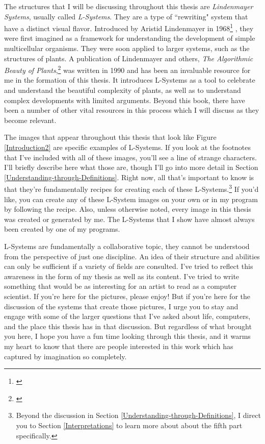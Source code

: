 \documentclass[12pt,twoside]{reedthesis}
\begin{document}
The structures that I will be discussing throughout this thesis are \textit{Lindenmayer Systems}, usually called \textit{L-Systems}. They are a type of ``rewriting" system that have a distinct visual flavor. Introduced by Aristid Lindenmayer in 1968\footnote{\cite{OG1967}} , they were first imagined as a framework for understanding the development of simple multicellular organisms. They were soon applied to larger systems, such as the structures of plants. A publication of Lindenmayer and others, \textit{The Algorithmic Beauty of Plants},\footnote{\cite{ABOP1990}} was written in 1990 and has been an invaluable resource for me in the formation of this thesis. It introduces L-Systems as a tool to celebrate and understand the beautiful complexity of plants, as well as to understand complex developments with limited arguments. Beyond this book, there have been a number of other vital resources in this process which I will discuss as they become relevant.

The images that appear throughout this thesis that look like Figure \ref{Introduction2} are specific examples of L-Systems. If you look at the footnotes that I've included with all of these images, you'll see a line of strange characters. I'll briefly describe here what those are, though I'll go into more detail in Section \ref{Understanding-through-Definitions}. Right now, all that's important to know is that they're fundamentally recipes for creating each of these L-Systems.\footnote{Beyond the discussion in Section \ref{Understanding-through-Definitions}, I direct you to Section \ref{Interpretations} to learn more about about the fifth part specifically.} If you'd like, you can create any of these L-System images on your own or in my program by following the recipe.  Also, unless otherwise noted, every image in this thesis was created or generated by me. The L-Systems that I show have almost always been created by one of my programs. 

L-Systems are fundamentally a collaborative topic, they cannot be understood from the perspective of just one discipline. An idea of their structure and abilities can only be sufficient if a variety of fields are consulted. I've tried to reflect this awareness in the form of my thesis as well as its content. I've tried to write something that would be as interesting for an artist to read as a computer scientist. If you're here for the pictures, please enjoy! But if you're here for the discussion of the systems that create those pictures, I urge you to stay and engage with some of the larger questions that I've asked about life, computers, and the place this thesis has in that discussion. But regardless of what brought you here, I hope you have a fun time looking through this thesis, and it warms my heart to know that there are people interested in this work which has captured by imagination so completely.
\end{document}
